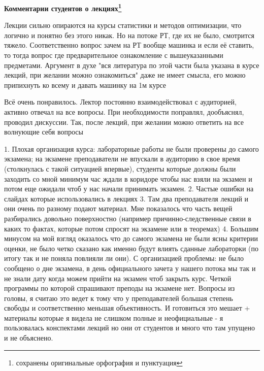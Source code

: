 		\textbf{Комментарии студентов о лекциях\protect\footnote{сохранены оригинальные орфография и пунктуация}}
            \begin{commentbox} 
                Лекции сильно опираются на курсы статистики и методов оптимизации, что логично и понятно без этого никак. Но на потоке РТ, где их не было, смотрится тяжело. Соответственно вопрос зачем на РТ вообще машинка и если её ставить, то тогда вопрос где предварительное ознакомление с вышеуказанными предметами. Аргумент в духе "вся литература по этой части была указана в курсе лекций, при желании можно ознакомиться" даже не имеет смысла, его можно припихнуть ко всему и давать машинку на 1м курсе
            \end{commentbox} 
        
            \begin{commentbox} 
                Всё очень понравилось. Лектор постоянно взаимодействовал с аудиторией, активно отвечал на все вопросы. При необходимости поправлял, дообъяснял, проводил дискуссии. Так, после лекций, при желании можно ответить на все волнующие себя вопросы 
            \end{commentbox} 
        
            \begin{commentbox} 
                1. Плохая организация курса: лабораторные работы не были проверены до самого экзамена; на экзамене преподаватели не впускали в аудиторию в свое время (столкнулась с такой ситуацией впервые), студенты которые должны были заходить со мной минимум час ждали в коридоре чтобы нас взяли на экзамен и потом еще ожидали чтоб у нас начали принимать экзамен.
                2. Частые ошибки на слайдах которые использовались в лекциях
                3. Там два преподавателя лекций и они очень по разному подают материал. Мне показалось что часть вещей разбирались довольно поверхностно (например причинно-следственные связи в каких то фактах, которые потом спросят на экзамене или в теоремах)
                4. Большим минусом на мой взгляд оказалось что до самого экзамена не были ясны критерии оценки, не было четко сказано как именно будут влиять сданные лабораторки (по итогу так и не поняла повлияли ли они). С организацией проблемы: не было сообщено о дне экзамена, в день официального зачета у нашего потока мы так и не знали дату когда можем прийти на экзамен чтоб закрыть курс. Четкой программы по которой спрашивают преподы на экзамене нет. Вопросы из головы, я считаю это ведет к тому что у преподавателей большая степень свободы и соответственно меньшая объективность. И готовиться это мешает + материалы которые я видела не слишком полные и неофициальные - я пользовалась конспектами лекций но они от студентов и много что там упущено и не объяснено.
            \end{commentbox} 
        
